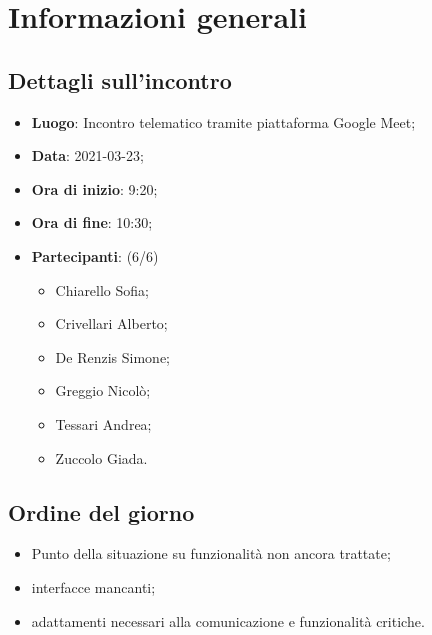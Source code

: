 \section{Informazioni generali}

\subsection{Dettagli sull'incontro}
\begin{itemize}
\item \textbf{Luogo}: Incontro telematico tramite piattaforma Google Meet;
\item \textbf{Data}: 2021-03-23;
\item \textbf{Ora di inizio}: 9:20;
\item \textbf{Ora di fine}: 10:30;
\item \textbf{Partecipanti}: (6/6)
\begin{itemize}
	\item Chiarello Sofia;
	\item Crivellari Alberto;
	\item De Renzis Simone;
	\item Greggio Nicolò;
	\item Tessari Andrea;
	\item Zuccolo Giada.
\end{itemize}
\end{itemize}

\subsection{Ordine del giorno}
\begin{itemize}
	\item Punto della situazione su funzionalità non ancora trattate;
    \item interfacce mancanti;
    \item adattamenti necessari alla comunicazione e funzionalità critiche.
\end{itemize}


